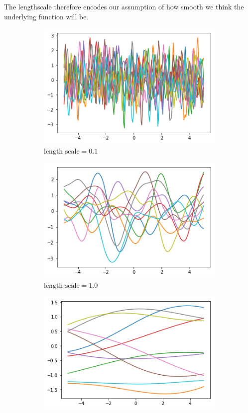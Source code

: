 \documentclass{article}
\begin{document}
The lengthscale therefore encodes our assumption of how smooth we think the underlying function will be.
\begin{figure}[H]
	\centering
	\begin{subfigure}[t]{0.3\linewidth}
		\includegraphics[width=\linewidth]{01}
		\caption{$\text{length scale} = 0.1$}
		\label{fig:0.1l}
	\end{subfigure}
	\begin{subfigure}[t]{0.3\linewidth}
		\includegraphics[width=\linewidth]{1}
		\caption{$\text{length scale} = 1.0$}
		\label{fig:1.0l}
	\end{subfigure}
	\begin{subfigure}[t]{0.3\linewidth}
		\includegraphics[width=\linewidth]{10}

\end{subfigure}
\end{figure}
\end{document}
